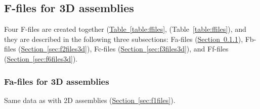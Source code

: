 \documentclass[letterpaper,11pt]{article}
\begin{document}
\subsection{F-files for 3D assemblies}\label{sec:ffiles3d}
Four F-files are created together
(\hyperref[table:ffiles]{Table~\ref*{table:ffiles}},
(Table~\ref{table:ffiles}),
and they are described in the following three subsections:
Fa-files
(\hyperref[sec:f1files3d]{Section~\ref*{sec:f1files3d}}),
Fb-files (\hyperref[sec:f2files3d]{Section~\ref*{sec:f2files3d}}),
Fc-files (\hyperref[sec:f3files3d]{Section~\ref*{sec:f3files3d}}),
and Ff-files (\hyperref[sec:f6files3d]{Section~\ref*{sec:f6files3d}}).

\subsubsection{Fa-files for 3D assemblies}\label{sec:f1files3d}
Same data as with 2D assemblies
(\hyperref[sec:f1files]{Section~\ref*{sec:f1files}}).
%
\end{document}
